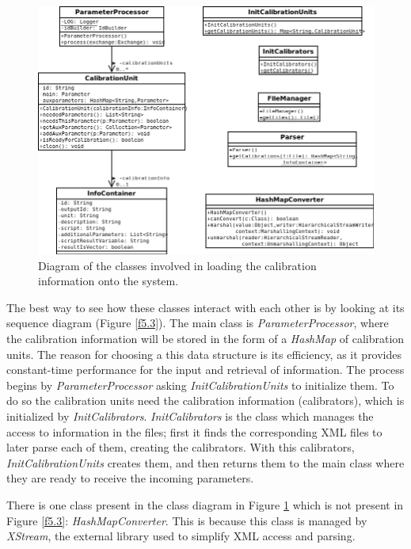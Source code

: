 \begin{figure}[H]
\centerline{\includegraphics[width=1\textwidth]{images/LoadInfoClassDiagram.png}}
\caption{Diagram of the classes involved in loading the calibration information onto the system.}
\label{f5.2}
\end{figure}




The best way to see how these classes interact with each other is by looking at its sequence diagram (Figure \ref{f5.3}). The main class is \emph{ParameterProcessor}, where the calibration information will be stored in the form of a \emph{HashMap} of calibration units. The reason for choosing a this data structure is its efficiency, as it provides constant-time performance for the input and retrieval of information\cite{HashMap}. The process begins by \emph{ParameterProcessor} asking \emph{InitCalibrationUnits} to initialize them. To do so the calibration units need the calibration information (calibrators), which is initialized  by \emph{InitCalibrators}. \emph{InitCalibrators} is the class which manages the access to information in the files; first it finds the corresponding XML files to later parse each of them, creating the calibrators. With this calibrators, \emph{InitCalibrationUnits} creates them, and then returns them to the main class where they are ready to receive the incoming parameters.

There is one class present in the class diagram in Figure \ref{f5.2} which is not present in Figure \ref{f5.3}: \emph{HashMapConverter}. This is because this class is managed by \emph{XStream}, the external library used to simplify XML access and parsing. 


